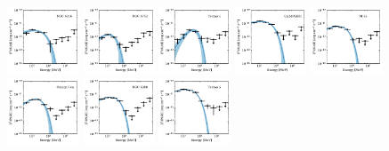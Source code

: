 \documentclass[doublespace,nopageskip]{VTthesis} %
\begin{document}
\begin{appendices}
\begin{figure}
\includegraphics[width=0.19\textwidth]{Figures/Globular/spectra/PLE_spectrum_13.pdf}
\includegraphics[width=0.19\textwidth]{Figures/Globular/spectra/PLE_spectrum_24.pdf}
\includegraphics[width=0.19\textwidth]{Figures/Globular/spectra/PLE_spectrum_27.pdf}
\includegraphics[width=0.19\textwidth]{Figures/Globular/spectra/PLE_spectrum_1.pdf}
\includegraphics[width=0.19\textwidth]{Figures/Globular/spectra/PLE_spectrum_11.pdf}
\includegraphics[width=0.19\textwidth]{Figures/Globular/spectra/PLE_spectrum_6.pdf}
\includegraphics[width=0.19\textwidth]{Figures/Globular/spectra/PLE_spectrum_15.pdf}
\includegraphics[width=0.19\textwidth]{Figures/Globular/spectra/PLE_spectrum_29.pdf}

\end{figure}
\end{appendices}
\end{document}
